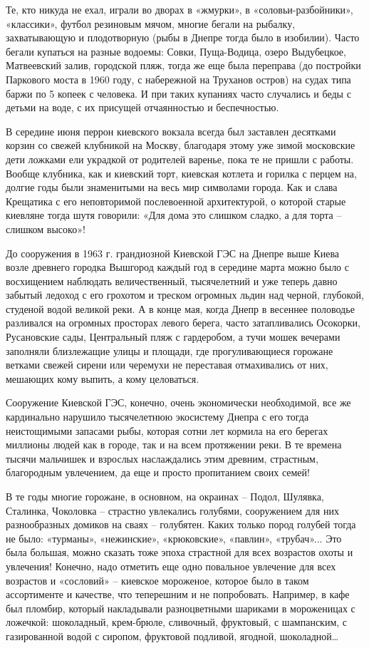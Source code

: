 Те, кто никуда не ехал, играли во дворах в «жмурки», в «соловьи-разбойники»,
«классики», футбол резиновым мячом, многие бегали на рыбалку, захватывающую и
плодотворную (рыбы в Днепре тогда было в изобилии). Часто бегали купаться на
разные водоемы: Совки, Пуща-Водица, озеро Выдубецкое, Матвеевский залив,
городской пляж, тогда же еще была переправа (до постройки Паркового моста в
1960 году, с набережной на Труханов остров) на судах типа баржи по 5 копеек с
человека. И при таких купаниях часто случались и беды с детьми на воде, с их
присущей отчаянностью и беспечностью. 

В середине июня перрон киевского вокзала всегда был заставлен десятками корзин
со свежей клубникой на Москву, благодаря этому уже зимой московские дети
ложками ели украдкой от родителей варенье, пока те не пришли с работы. Вообще
клубника, как и киевский торт, киевская котлета и горилка с перцем на, долгие
годы были знаменитыми на весь мир символами города. Как и слава Крещатика с его
неповторимой послевоенной архитектурой, о которой старые киевляне тогда шутя
говорили: «Для дома это слишком сладко, а для торта – слишком высоко»! 

До сооружения в 1963 г. грандиозной Киевской ГЭС на Днепре выше Киева возле
древнего городка Вышгород каждый год в середине марта можно было с восхищением
наблюдать величественный, тысячелетний и уже теперь давно забытый ледоход с его
грохотом и треском огромных льдин над черной, глубокой, студеной водой великой
реки. А в конце мая, когда Днепр в весеннее половодье разливался на огромных
просторах левого берега, часто затапливались Осокорки, Русановские сады,
Центральный пляж с гардеробом, а тучи мошек вечерами заполняли близлежащие
улицы и площади, где прогуливающиеся горожане ветками свежей сирени или
черемухи не переставая отмахивались от них, мешающих кому выпить, а кому
целоваться.

Сооружение Киевской ГЭС, конечно, очень экономически необходимой, все же
кардинально нарушило тысячелетнюю экосистему Днепра с его тогда неистощимыми
запасами рыбы, которая сотни лет кормила на его берегах миллионы людей как в
городе, так и на всем протяжении реки. В те времена тысячи мальчишек и взрослых
наслаждались этим древним, страстным, благородным увлечением, да еще и просто
пропитанием своих семей!

В те годы многие горожане, в основном, на окраинах – Подол, Шулявка, Сталинка,
Чоколовка – страстно увлекались голубями, сооружением для них разнообразных
домиков на сваях – голубятен. Каких только пород голубей тогда не было:
«турманы», «нежинские», «крюковские», «павлин», «трубач»... Это была большая,
можно сказать тоже эпоха страстной для всех возрастов охоты и увлечения!
Конечно, надо отметить еще одно повальное увлечение для всех возрастов и
«сословий» – киевское мороженое, которое было в таком ассортименте и качестве,
что теперешним и не попробовать. Например, в кафе был пломбир, который
накладывали разноцветными шариками в мороженицах с ложечкой: шоколадный,
крем-брюле, сливочный, фруктовый, с шампанским, с газированной водой с сиропом,
фруктовой подливой, ягодной, шоколадной… 

